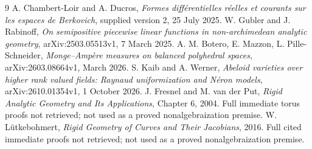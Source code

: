 \documentclass[11pt]{article}
\theoremstyle{definition}\newtheorem{definition}[theorem]{Definition}
\begin{document}
\begin{thebibliography}{9}
 A. Chambert-Loir and A. Ducros,
\emph{Formes diff\'erentielles r\'eelles et courants sur les espaces de
Berkovich}, supplied version 2, 25 July 2025.
 W. Gubler and J. Rabinoff,
\emph{On semipositive piecewise linear functions in non-archimedean
analytic geometry}, arXiv:2503.05513v1, 7 March 2025.
 A. M. Botero, E. Mazzon, L. Pille-Schneider,
\emph{Monge--Amp\`ere measures on balanced polyhedral spaces},
arXiv:2603.08664v1, March 2026.
 S. Kaib and A. Werner,
\emph{Abeloid varieties over higher rank valued fields: Raynaud
uniformization and N\'eron models}, arXiv:2610.01354v1, 1 October 2026.
 J. Fresnel and M. van der Put,
\emph{Rigid Analytic Geometry and Its Applications}, Chapter 6,
2004. Full immediate torus proofs not retrieved; not used as a proved
nonalgebraization premise.
 W. L\"utkebohmert,
\emph{Rigid Geometry of Curves and Their Jacobians}, 2016.
Full cited immediate proofs not retrieved; not used as a proved
nonalgebraization premise.
\end{thebibliography}
\end{document}
